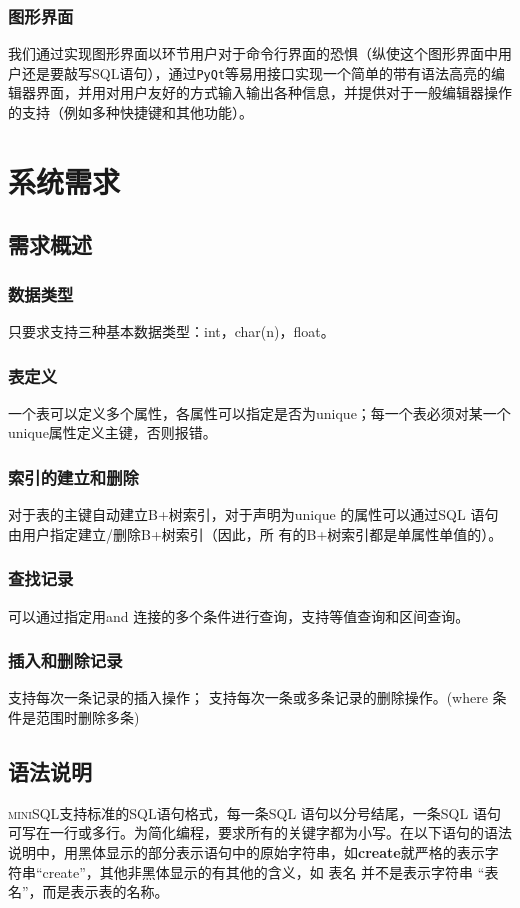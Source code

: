 \documentclass[UTF8]{ctexrep} %
\begin{document}
\subsection{图形界面}
我们通过实现图形界面以环节用户对于命令行界面的恐惧（纵使这个图形界面中用户还是要敲写SQL语句），通过\texttt{PyQt}等易用接口实现一个简单的带有语法高亮的编辑器界面，并用对用户友好的方式输入输出各种信息，并提供对于一般编辑器操作的支持（例如多种快捷键和其他功能）。

\chapter{系统需求}
\section{需求概述}
\subsection{数据类型}
只要求支持三种基本数据类型：int，char(n)，float。
\subsection{表定义}
一个表可以定义多个属性，各属性可以指定是否为unique；每一个表必须对某一个unique属性定义主键，否则报错。
\subsection{索引的建立和删除}
对于表的主键自动建立B+树索引，对于声明为unique 的属性可以通过SQL 语句由用户指定建立/删除B+树索引（因此，所
有的B+树索引都是单属性单值的）。
\subsection{查找记录}
可以通过指定用and 连接的多个条件进行查询，支持等值查询和区间查询。
\subsection{插入和删除记录}
支持每次一条记录的插入操作；
支持每次一条或多条记录的删除操作。(where 条件是范围时删除多条)

\section{语法说明}
\textsc{miniSQL}支持标准的SQL语句格式，每一条SQL 语句以分号结尾，一条SQL 语句可写在一行或多行。为简化编程，要求所有的关键字都为小写。在以下语句的语法说明中，用黑体显示的部分表示语句中的原始字符串，如\textbf{create}就严格的表示字符串“create”，其他非黑体显示的有其他的含义，如 表名 并不是表示字符串 “表名”，而是表示表的名称。
\end{document}
